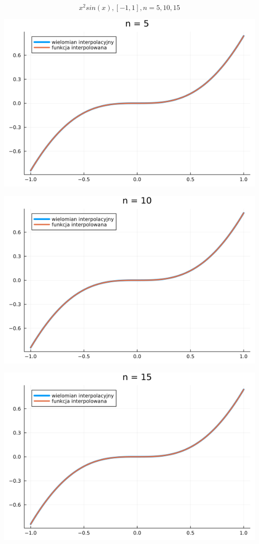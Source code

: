 \documentclass{article}
\begin{document}
\[
    x^2sin(x), [-1, 1], n = 5, 10, 15
\]

\begin{center}
    \includegraphics[scale=0.4]{5b_5.png}
\end{center}
\begin{center}
    \includegraphics[scale=0.4]{5b_10.png}
\end{center}
\begin{center}
    \includegraphics[scale=0.4]{5b_15.png}
\end{center}
\end{document}
